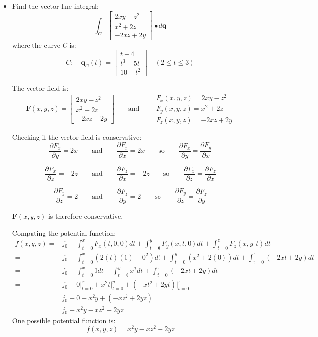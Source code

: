 \documentclass{article}
\begin{document}
\begin{itemize}
\item
Find the vector line integral: 
\[\int_C \begin{bmatrix}
2xy - z^2 \\ 
x^2 + 2z \\ 
-2xz + 2y
\end{bmatrix} \bullet d\mathbf{q}\]
where the curve \(C\) is:
\[C : \quad \mathbf{q}_C(t) = \begin{bmatrix}
t - 4 \\ 
t^3 - 5t \\ 
10 - t^2
\end{bmatrix} \quad 
(2 \leq t \leq 3)\]
 
The vector field is: 
\[\mathbf{F}(x,y,z) = \begin{bmatrix}
2xy - z^2 \\ 
x^2 + 2z \\ 
-2xz + 2y
\end{bmatrix} \quad\quad\text{and}\quad\quad \begin{array}{l} 
F_x(x,y,z) = 2xy - z^2 \\ 
F_y(x,y,z) = x^2 + 2z \\ 
F_z(x,y,z) = -2xz + 2y
\end{array}\]

Checking if the vector field is conservative:
\[\frac{\partial F_x}{\partial y} = 2x \quad\quad\text{and}\quad\quad \frac{\partial F_y}{\partial x} = 2x \quad\quad\text{so}\quad\quad \frac{\partial F_x}{\partial y} = \frac{\partial F_y}{\partial x}\]

\[\frac{\partial F_x}{\partial z} = -2z \quad\quad\text{and}\quad\quad \frac{\partial F_z}{\partial x} = -2z \quad\quad\text{so}\quad\quad \frac{\partial F_x}{\partial z} = \frac{\partial F_z}{\partial x}\]

\[\frac{\partial F_y}{\partial z} = 2 \quad\quad\text{and}\quad\quad \frac{\partial F_z}{\partial y} = 2 \quad\quad\text{so}\quad\quad \frac{\partial F_y}{\partial z} = \frac{\partial F_z}{\partial y}\]

\(\mathbf{F}(x,y,z)\) is therefore conservative. 

Computing the potential function:
\begin{align*}
f(x,y,z) = & f_0 + \int_{t = 0}^x F_x(t,0,0)dt + \int_{t=0}^y F_y(x,t,0)dt + \int_{t=0}^z F_z(x,y,t)dt \\  
= & f_0 + \int_{t = 0}^x (2(t)(0) - 0^2)dt + \int_{t = 0}^y (x^2 + 2(0))dt + \int_{t = 0}^z (-2xt + 2y)dt \\ 
= & f_0 + \int_{t = 0}^x 0dt + \int_{t = 0}^y x^2 dt + \int_{t = 0}^z (-2xt + 2y)dt \\
= & f_0 + 0\Big|_{t = 0}^x + x^2 t \Big|_{t = 0}^y + (-xt^2 + 2yt)\Big|_{t = 0}^z \\
= & f_0 + 0 + x^2 y + (-xz^2 + 2yz) \\ 
= & f_0 + x^2 y - x z^2 + 2yz
\end{align*}
One possible potential function is: 
\[f(x,y,z) = x^2 y - x z^2 + 2yz\]


\end{itemize}
\end{document}
